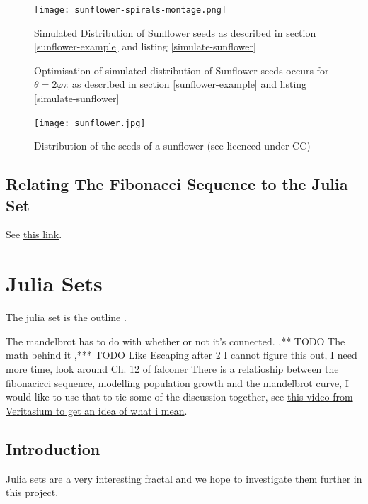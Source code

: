 \documentclass[11pt]{article}
\begin{document}
\begin{figure}[htbp]
\centering
\texttt{[image: sunflower-spirals-montage.png]}
\caption{\label{simulate-sunflower-image}Simulated Distribution of Sunflower seeds as described in section \ref{sunflower-example} and listing \ref{simulate-sunflower}}
\end{figure}

\begin{figure}[htbp]
\centering

\caption{\label{simulate-sunflower-phi}Optimisation of simulated distribution of Sunflower seeds occurs for \(\theta =2 \varphi  \pi\) as described in section \ref{sunflower-example} and listing \ref{simulate-sunflower}}
\end{figure}


\begin{figure}[htbp]
\centering
\texttt{[image: sunflower.jpg]}
\caption{\label{sunflower}Distribution of the seeds of a sunflower (see \cite{simonbrassCCSearch2006} licenced under CC)}
\end{figure}

\subsection{Relating The Fibonacci Sequence to the Julia Set}
\label{sec:org4b34668}
See \href{https://youtu.be/ovJcsL7vyrk}{this link}.
\section{Julia Sets}
\label{sec:orgd203cf7}

The julia set is the outline \cite[Ch. 14]{peitgenChaosFractalsNew2004}.

The mandelbrot has to do with whether or not it's connected.
,** TODO The math behind it
,*** TODO Like Escaping after 2
I cannot figure this out, I need more time, look around Ch. 12 of falconer \cite{falconerFractalGeometryMathematical2003}
There is a relatioship between the fibonacicci sequence, modelling population growth and the mandelbrot curve, I would like to use that to tie some of the discussion together, see \href{https://youtu.be/ovJcsL7vyrk}{this video from Veritasium to get an idea of what i mean}.


\subsection{Introduction}
\label{sec:org8e05b05}
Julia sets are a very interesting fractal and we hope to investigate them further in this project.
\end{document}
